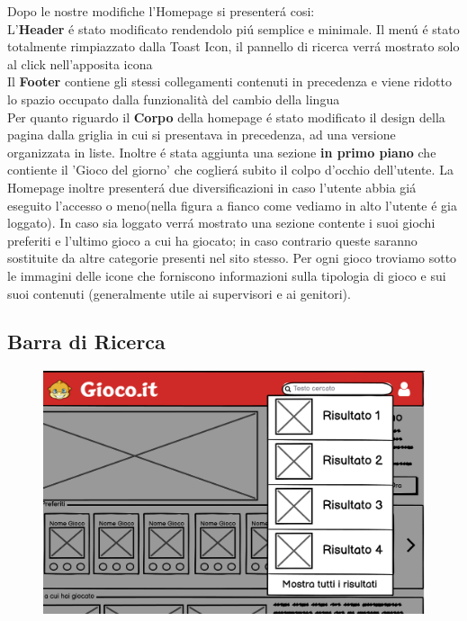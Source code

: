 \documentclass[../Report.tex]{subfiles}
\begin{document}
    Dopo le nostre modifiche l'Homepage si presenterá cosi:\\

         L'\textbf{Header} é stato modificato rendendolo piú semplice e minimale. Il menú é stato totalmente rimpiazzato dalla Toast Icon, il pannello di ricerca verrá mostrato solo al click nell'apposita icona\\
         
         Il \textbf{Footer} contiene gli stessi collegamenti contenuti in precedenza e viene ridotto lo spazio occupato dalla funzionalità del cambio della lingua\\


         Per quanto riguardo il \textbf{Corpo} della homepage  é stato modificato il design della pagina dalla griglia in cui si presentava in precedenza, ad una versione organizzata in liste.
         Inoltre é stata aggiunta una sezione \textbf{in primo piano} che contiente il 'Gioco del giorno' che coglierá subito il colpo d'occhio dell'utente.
         La Homepage inoltre presenterá due diversificazioni in caso l'utente abbia giá eseguito l'accesso o meno(nella figura a fianco come vediamo in alto l'utente é gia loggato).
         In caso sia loggato verrá mostrato una sezione contente i suoi giochi preferiti e l'ultimo gioco a cui ha giocato; in caso contrario queste saranno sostituite da altre categorie presenti nel sito stesso.
         Per ogni gioco troviamo sotto le immagini delle icone che forniscono informazioni sulla tipologia di gioco e sui suoi contenuti (generalmente utile ai supervisori e ai genitori).
         

    \subsection{Barra di Ricerca}
    \begin{figure}[H]
        \includegraphics[width=\linewidth]{WSearchBar.png}
        \centering
    \end{figure}
    
\end{document}

